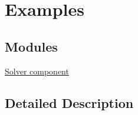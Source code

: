 \hypertarget{group__examples}{\section{Examples}
\label{group__examples}
}
\subsection*{Modules}
\begin{DoxyCompactItemize}
\item 
\hyperlink{group__examples__solver}{Solver component}
\end{DoxyCompactItemize}


\subsection{Detailed Description}
